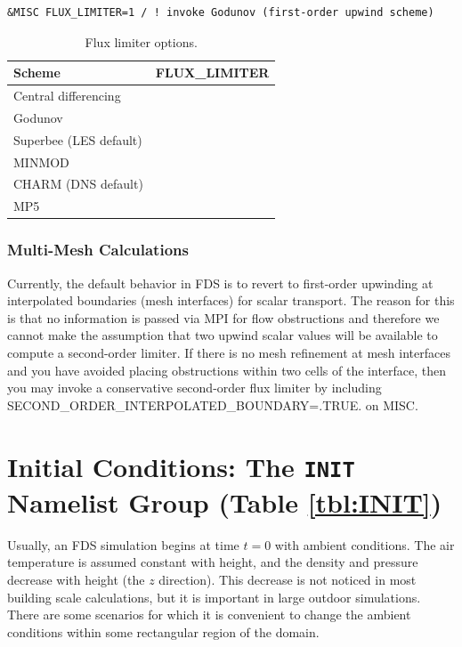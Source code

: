 \documentclass[11pt]{book}
\begin{document}
\begin{lstlisting}
&MISC FLUX_LIMITER=1 / ! invoke Godunov (first-order upwind scheme)
\end{lstlisting}

\begin{table}[ht]
\caption[Flux limiter options]{Flux limiter options.}
\label{tab:flux_limiters}
\centering
\begin{tabular}{|lc|}
\hline
Scheme                 & {\ct FLUX\_LIMITER} \\
\hline
Central differencing   & {\ct 0}  \\
Godunov                & {\ct 1}  \\
Superbee (LES default) & {\ct 2}  \\
MINMOD                 & {\ct 3}  \\
CHARM (DNS default)    & {\ct 4}  \\
MP5                    & {\ct 5}  \\ \hline
\end{tabular}
\end{table}

\subsubsection{Multi-Mesh Calculations}

Currently, the default behavior in FDS is to revert to first-order upwinding at interpolated boundaries (mesh interfaces) for scalar transport.  The reason for this is that no information is passed via MPI for flow obstructions and therefore we cannot make the assumption that two upwind scalar values will be available to compute a second-order limiter.  If there is no mesh refinement at mesh interfaces and you have avoided placing obstructions within two cells of the interface, then you may invoke a conservative second-order flux limiter by including {\ct SECOND\_ORDER\_INTERPOLATED\_BOUNDARY=.TRUE.} on {\ct MISC}.



\section{Initial Conditions: The \texorpdfstring{{\tt INIT}}{INIT} Namelist Group (Table \ref{tbl:INIT})}
\label{info:INIT}

Usually, an FDS simulation begins at time $t=0$ with ambient conditions. The air temperature is
assumed constant with height, and the density and pressure decrease with height (the $z$ direction). This
decrease is not noticed in most building scale calculations, but it is important in large outdoor
simulations. There are some scenarios for which it is convenient to change the ambient conditions within some
rectangular region of the domain.
\end{document}
